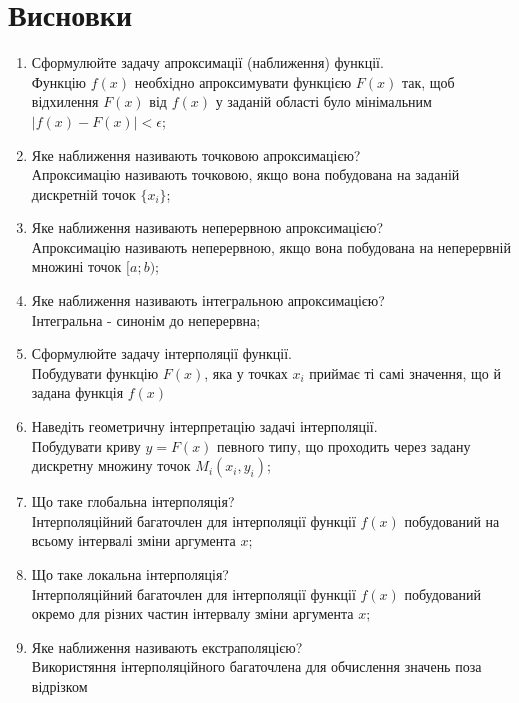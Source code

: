 \section{Висновки}
\label{sec:summary}

\begin{enumerate}
    \item Сформулюйте задачу апроксимації (наближення) функції. \\
          Функцію $f(x)$ необхідно апроксимувати функцією $F(x)$ так,
          щоб відхилення $F(x)$ від $f(x)$ у заданій області було мінімальним
          $|f(x) - F(x)| < \epsilon$;
    \item Яке наближення називають точковою апроксимацією? \\
          Апроксимацію називають точковою, якщо вона побудована на заданій дискретній точок
          $\{x_i\}$;
    \item Яке наближення називають неперервною апроксимацією? \\
          Апроксимацію називають неперервною, якщо вона побудована на неперервній множині точок
          $[a; b)$;
    \item Яке наближення називають інтегральною апроксимацією? \\
          Інтегральна - синонім до неперервна;
    \item Сформулюйте задачу інтерполяції функції. \\
          Побудувати функцію $F(x)$, яка у точках $x_i$ приймає ті самі значення,
          що й задана функція $f(x)$
    \item Наведіть геометричну інтерпретацію задачі інтерполяції. \\
          Побудувати криву $y = F(x)$ певного типу, що проходить через задану дискретну
          множину точок $M_i(x_i, y_i)$;
    \item Що таке глобальна інтерполяція? \\
          Інтерполяційний багаточлен для інтерполяції функції $f(x)$
          побудований на всьому інтервалі зміни аргумента $x$;
    \item Що таке локальна інтерполяція? \\
          Інтерполяційний багаточлен для інтерполяції функції $f(x)$
          побудований окремо для різних частин інтервалу зміни аргумента $x$;
    \item Яке наближення називають екстраполяцією? \\
          Використяння інтерполяційного багаточлена для обчислення значень поза відрізком

\end{enumerate}
